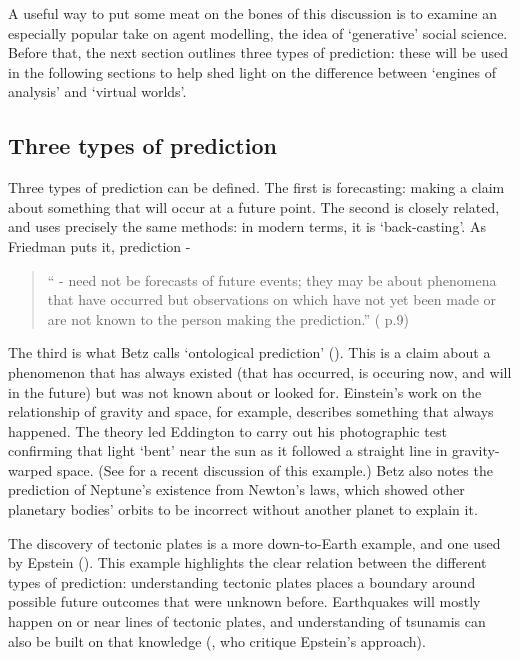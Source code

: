 A useful way to put some meat on the bones of this discussion is to examine an especially popular take on agent modelling, the idea of `generative' social science. Before that, the next section outlines three types of prediction: these will be used in the following sections to help shed light on the difference between `engines of analysis' and `virtual worlds'.

\subsection{Three types of prediction \label{sec:prediction}}

Three types of prediction can be defined. The first is forecasting: making a claim about something that will occur at a future point. The second is closely related, and uses precisely the same methods: in modern terms, it is `back-casting'. As Friedman puts it, prediction - 

\begin{quote}
`` - need not be forecasts of future events; they may be about phenomena that have occurred but observations on which have not yet been made or are not known to the person making the prediction.'' (\citealt{friedman_essays_1953} p.9)
\end{quote}

The third is what Betz calls `ontological prediction' (\citealt{betz_prediction_2006}). This is a claim about a phenomenon that has always existed (that has occurred, is occuring now, and will in the future) but was not known about or looked for. Einstein's work on the relationship of gravity and space, for example, describes something that always happened. The theory led Eddington to carry out his photographic test confirming that light `bent' near the sun as it followed a straight line in gravity-warped space. (See \citealt{almassi_trust_2009} for a recent discussion of this example.) Betz also notes the prediction of Neptune's existence from Newton's laws, which showed other planetary bodies' orbits to be incorrect without another planet to explain it. 

The discovery of tectonic plates is a more down-to-Earth example, and one used by Epstein (\citeyear{epstein_why_2008}). This example highlights the clear relation between the different types of prediction: understanding tectonic plates places a boundary around possible future outcomes that were unknown before. Earthquakes will mostly happen on or near lines of tectonic plates, and understanding of tsunamis can also be built on that knowledge (\citealt{thompson_contra_2009}, who critique Epstein's approach).

